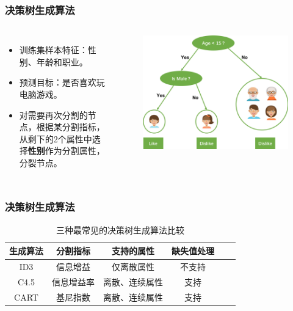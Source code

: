 \documentclass[10pt,aspectratio=43,mathserif]{beamer}
\begin{document}
        \begin{frame}
            \frametitle{\textbf{决策树生成算法}}
            \begin{columns}
                \footnotesize
                \begin{itemize}
                    \item 训练集样本特征：性别、年龄和职业。
                    \item 预测目标：是否喜欢玩电脑游戏。
                    \item 对需要再次分割的节点，根据某分割指标，从剩下的2个属性中选择\textbf{性别}作为分割属性，分裂节点。
                \end{itemize}

                \begin{figure}[!t]
                    \centering
                    \includegraphics[width=1.1\textwidth]{figures/dt_gen.png}
                \end{figure}
            \end{columns}
        \end{frame}

        \begin{frame}
            \frametitle{\textbf{决策树生成算法}}
            \begin{table}[htbp!]
                \caption{三种最常见的决策树生成算法比较}
                \label{dt_compare}
                \centering
                \begin{tabular}{c c c c c c}
                \hline
                生成算法 & 分割指标  & 支持的属性 & 缺失值处理 \\ \hline
                ID3 & 信息增益 & 仅离散属性 & 不支持\\     
                C4.5 & 信息增益率  & 离散、连续属性 & 支持\\    
                CART & 基尼指数 & 离散、连续属性 & 支持 \\ \hline
                \end{tabular}
            \end{table}
        \end{frame}
\end{document}
